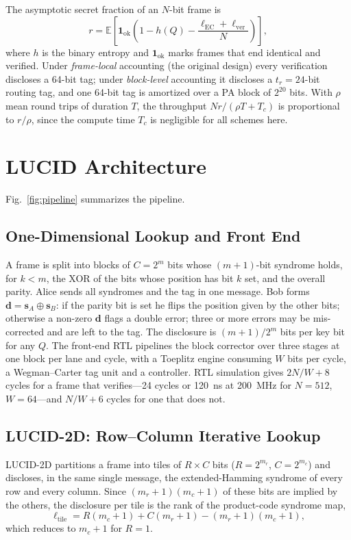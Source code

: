 \documentclass[conference]{IEEEtran}
\begin{document}
The asymptotic secret fraction of an $N$-bit frame is
\begin{equation}
r=\mathbb{E}\!\left[\mathbf{1}_{\mathrm{ok}}\left(1-h(Q)-\frac{\ell_{\mathrm{EC}}+\ell_{\mathrm{ver}}}{N}\right)\right],
\label{eq:r}
\end{equation}
where $h$ is the binary entropy and $\mathbf{1}_{\mathrm{ok}}$ marks frames that end identical and verified. Under \emph{frame-local} accounting (the original design) every verification discloses a 64-bit tag; under \emph{block-level} accounting it discloses a $t_r=24$-bit routing tag, and one 64-bit tag is amortized over a PA block of $2^{20}$ bits. With $\rho$ mean round trips of duration $T$, the throughput $Nr/(\rho T+T_c)$ is proportional to $r/\rho$, since the compute time $T_c$ is negligible for all schemes here.

\section{LUCID Architecture}\label{sec:arch}
Fig.~\ref{fig:pipeline} summarizes the pipeline.

\subsection{One-Dimensional Lookup and Front End}
A frame is split into blocks of $C=2^{m}$ bits whose $(m+1)$-bit syndrome holds, for $k<m$, the XOR of the bits whose position has bit $k$ set, and the overall parity. Alice sends all syndromes and the tag in one message. Bob forms $\mathbf{d}=\mathbf{s}_A\oplus\mathbf{s}_B$: if the parity bit is set he flips the position given by the other bits; otherwise a non-zero $\mathbf{d}$ flags a double error; three or more errors may be mis-corrected and are left to the tag. The disclosure is $(m+1)/2^m$ bits per key bit for any $Q$. The front-end RTL pipelines the block corrector over three stages at one block per lane and cycle, with a Toeplitz engine consuming $W$ bits per cycle, a Wegman--Carter tag unit and a controller. RTL simulation gives $2N/W+8$ cycles for a frame that verifies---24 cycles or 120~ns at 200~MHz for $N=512$, $W=64$---and $N/W+6$ cycles for one that does not.

\subsection{LUCID-2D: Row--Column Iterative Lookup}
LUCID-2D partitions a frame into tiles of $R\times C$ bits ($R=2^{m_r}$, $C=2^{m_c}$) and discloses, in the same single message, the extended-Hamming syndrome of every row and every column. Since $(m_r+1)(m_c+1)$ of these bits are implied by the others, the disclosure per tile is the rank of the product-code syndrome map,
\begin{equation}
\ell_{\mathrm{tile}}=R(m_c+1)+C(m_r+1)-(m_r+1)(m_c+1),
\label{eq:leak2d}
\end{equation}
which reduces to $m_c+1$ for $R=1$.
\end{document}
